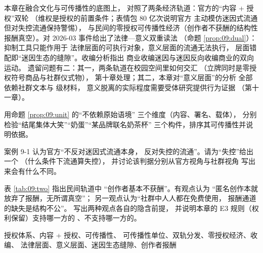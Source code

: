 本章在融合文化与可传播性的底图上，
对照了两条经济轨道：官方的“内容 + 授权”双轮
（维权是授权的前置条件；表情包 80 亿次说明官方
主动模仿迷因式流通但对失控流通保持警惕），
与民间的零授权可传播性经济（创作者不获酬的结构性
报酬真空）。对 2026-03 事件给出了法律—意义双重读法
（命题 \ref{prop:09:dual}）：抑制工具只能作用于
法律层面的可执行对象，意义层面的流通无法执行，
层面错配即“迷因生态的缝隙”。收编分析指出
商业收编迷因与迷因反向收编商业的双向运动。
遗留问题有二：其一，两条轨道在校园空间里如何交汇
（立牌同时是零授权符号商品与社群仪式物），
第十章处理；其二，本章对“意义层面”的分析
全部依赖社群文本与  级材料，
意义脱离的实际程度需要受体研究提供行为证据
（第十一章）。

\begin{nlexercises}
  \item 用命题 \ref{prop:09:unit} 的“不依赖原始语境”
        三个维度（内容、署名、载体），
        分别检验“结尾集体大笑”“奶蛋”“某品牌联名奶茶杯”
        三个构件，排序其可传播性并说明依据。
  \item 案例 9-1 认为官方“不反对迷因式流通本身，
        反对失控的流通”。请为“失控”给出一个
        （什么条件下流通算失控），
        并讨论该判据分别从官方视角与社群视角
        写出来会有什么不同。
  \item 表 \ref{tab:09:two} 指出民间轨道中
        “创作者基本不获酬”。有观点认为
        “匿名创作本就放弃了报酬，无所谓真空”；
        另一观点认为“社群中人人都在免费使用，
        报酬通道的缺失是结构不公”。
        写出两种观点各自的隐含前提，
        并说明本章的 E3 规则（权利保留）支持哪一方的
        、不支持哪一方的。
\end{nlexercises}

\nlkeywords 授权体系、内容 + 授权、可传播性、
可传播性单位、双轨分发、零授权经济、收编、
法律层面、意义层面、迷因生态缝隙、创作者报酬
